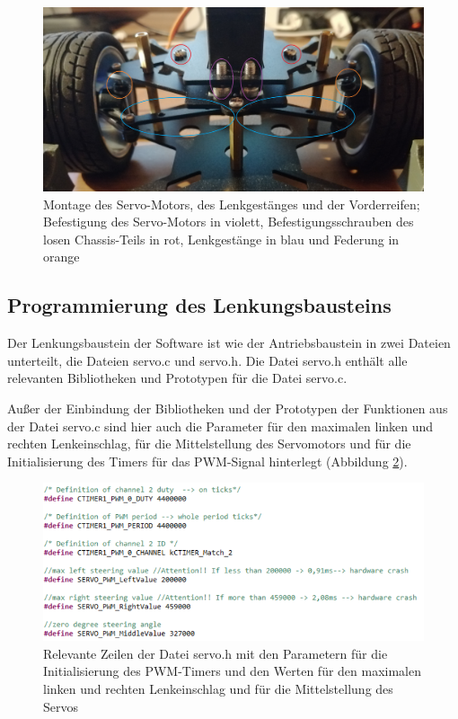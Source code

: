 \begin{figure}[H] %
\includegraphics[width=.90\textwidth]{sec5/images/MontageLenkungskomponenten} 
\centering
\captionsetup{width=.95\textwidth}
\caption[Montage der Lenkungskomponenten]{Montage des Servo-Motors, des Lenkgestänges und der Vorderreifen; Befestigung des Servo-Motors in violett, Befestigungsschrauben des losen Chassis-Teils in rot, Lenkgestänge in blau und Federung in orange}\centering
\label{fig:MontageLenkungskomponenten}
\end{figure}

\newpage
\subsection{Programmierung des Lenkungsbausteins}\label{Sec5Sub3}

Der Lenkungsbaustein der Software ist wie der Antriebsbaustein in zwei Dateien unterteilt, die Dateien \glqq{}servo.c\grqq{} und  \glqq{}servo.h\grqq{}. Die Datei \glqq{}servo.h\grqq{} enthält alle relevanten Bibliotheken und Prototypen für die Datei \glqq{}servo.c\grqq{}.\vspace{11pt}

Außer der Einbindung der Bibliotheken und der Prototypen der Funktionen aus der Datei \glqq{}servo.c\grqq{} sind hier auch die Parameter für den maximalen linken und rechten Lenkeinschlag, für die Mittelstellung des Servomotors und für die Initialisierung des Timers für das \ac{PWM}-Signal hinterlegt (Abbildung \ref{fig:ServoH}). 

\begin{figure}[H] %
\includegraphics[width=.90\textwidth]{sec5/images/ServoH} 
\centering
\captionsetup{width=.95\textwidth}
\caption[Relevante Zeilen der Datei \glqq{}servo.h\grqq{}]{Relevante Zeilen der Datei \glqq{}servo.h\grqq{} mit den Parametern für die Initialisierung des \ac{PWM}-Timers und den Werten für den maximalen linken und rechten Lenkeinschlag und für die Mittelstellung des Servos}\centering
\label{fig:ServoH}
\end{figure}

